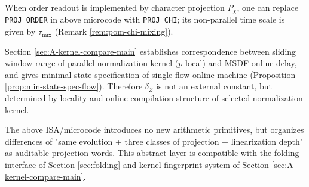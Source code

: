 \begin{remark}
When order readout is implemented by character projection $P_\chi$, one can replace \texttt{PROJ\_ORDER} in above microcode with \texttt{PROJ\_CHI}; its non-parallel time scale is given by $\tau_{\mathrm{mix}}$ (Remark \ref{rem:pom-chi-mixing}).
\end{remark}

\begin{remark}\label{rem:pom-plocal-delay}
Section \ref{sec:A-kernel-compare-main} establishes correspondence between sliding window range of parallel normalization kernel ($p$-local) and MSDF online delay, and gives minimal state specification of single-flow online machine (Proposition \ref{prop:min-state-spec-flow}). Therefore $\delta_Z$ is not an external constant, but determined by locality and online compilation structure of selected normalization kernel.
\end{remark}

The above ISA/microcode introduces no new arithmetic primitives, but organizes differences of "same evolution + three classes of projection + linearization depth" as auditable projection words. This abstract layer is compatible with the folding interface of Section \ref{sec:folding} and kernel fingerprint system of Section \ref{sec:A-kernel-compare-main}.

